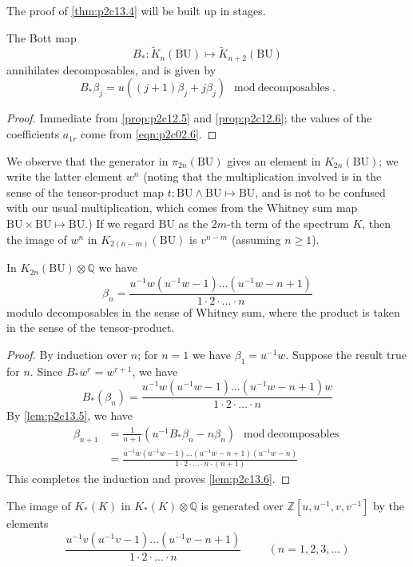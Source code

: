 \documentclass[../main]{subfiles}
\begin{document}
The proof of \eqref{thm:p2c13.4} will be built up in stages. 
\begin{lemma}
\label{lem:p2c13.5}
The Bott map $$B_\ast:\widetilde{K}_n(\mathrm{BU})\mapsto\widetilde{K}_{n+2}(\mathrm{BU})$$ annihilates decomposables, and is given by $$B_\ast\beta_j=u((j+1)\beta_j+j\beta_j)\mod{\text{decomposables}}.$$
\end{lemma}
\begin{proof}
Immediate from \eqref{prop:p2c12.5} and \eqref{prop:p2c12.6}; the values of the coefficients $a_{1r}$ come from \eqref{eqn:p2c02.6}. 
\end{proof}
We observe that the generator in $\pi_{2n}(\mathrm{BU})$ gives an element in $K_{2n}(\mathrm{BU})$; we write the latter element $w^n$ (noting that the multiplication involved is in the sense of the tensor-product map $t:\mathrm{BU}\wedge\mathrm{BU}\mapsto\mathrm{BU}$, and is not to be confused with our usual multiplication, which comes
from the Whitney sum map $\mathrm{BU}\times\mathrm{BU}\mapsto\mathrm{BU}$.) If we regard $\mathrm{BU}$ as the $2m$-th term of the spectrum $K$, then the image of $w^n$ in $K_{2(n-m)}(\mathrm{BU})$ is $v^{n-m}$ (assuming $n\ge 1$). 
\begin{lemma}
\label{lem:p2c13.6}
In $K_{2n}(\mathrm{BU})\otimes\mathbb{Q}$ we have $$\beta_n = \frac{u^{-1}w (u^{-1}w-1)\dots(u^{-1}w-n+1)}{1\cdot 2\cdot \ldots \cdot n}$$ modulo decomposables in the sense of Whitney sum, where the product
is taken in the sense of the tensor-product.
\end{lemma}
\begin{proof}
By induction over $n$; for $n=1$ we have $\beta_1=u^{-1} w$. Suppose the result true for $n$. Since $B_\ast w^r = w^{r+1}$, we have $$B_\ast(\beta_n) = \frac{u^{-1}w (u^{-1}w-1)\dots(u^{-1}w-n+1)w}{1\cdot 2\cdot \ldots \cdot n}$$
By \eqref{lem:p2c13.5}, we have \begin{align*}
\beta_{n+1} &= \frac{1}{n+1}
(u^{-1} B_\ast \beta_n - n\beta_n)\mod{\text{decomposables}}\\
&= \frac{u^{-1}w (u^{-1}w-1)\dots(u^{-1}w-n+1)(u^{-1}w-n)}{1\cdot 2\cdot \ldots \cdot n \cdot (n+1)}
\end{align*}
This completes the induction and proves \eqref{lem:p2c13.6}.
\end{proof}
\begin{lemma}
\label{lem:p2c13.7}
The image of $K_\ast(K)$ in $K_\ast(K)\otimes \mathbb{Q}$ is generated over $\mathbb{Z}[u,u^{-1},v,v^{-1}]$ by the elements $$\frac{u^{-1}v(u^{-1}v-1)\dots(u^{-1}v-n+1)}{1\cdot 2\cdot\ldots \cdot n}\hspace{1cm} (n=1,2,3,\ldots)$$
\end{lemma}
\end{document}
